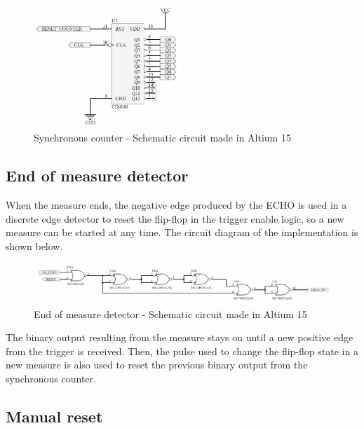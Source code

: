 \begin{figure}[H]
    \begin{centering}
    \includegraphics[width=0.5\textwidth]{data/Unit_Counter}
    \par\end{centering}
    \caption{Synchronous counter - Schematic circuit made in Altium 15}
\end{figure}

\subsection*{End of measure detector}

When the measure ends, the negative edge produced by the ECHO is used in a discrete edge detector 
to reset the flip-flop in the trigger enable logic, so a new measure can be started at any time.
The circuit diagram of the implementation is shown below.

\begin{figure}[H]
    \begin{centering}
    \includegraphics[width=1\textwidth]{data/Meas_End}
    \par\end{centering}
    \caption{End of measure detector - Schematic circuit made in Altium 15}
\end{figure}

The binary output resulting from the measure stays on until a new positive edge from the trigger is 
received. Then, the pulse used to change the flip-flop state in a new measure is also used to reset
the previous binary output from the synchronous counter.

\subsection*{Manual reset}

